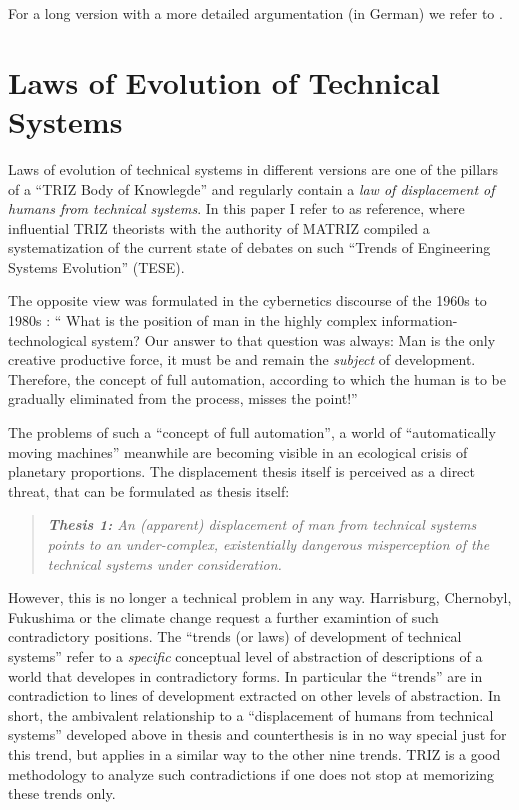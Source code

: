 \documentclass{llncs}
\begin{document}
For a long version with a more detailed argumentation (in German) we refer to
\cite{Graebe2020b}.

\section{Laws of Evolution of Technical Systems}

Laws of evolution of technical systems in different versions are one of the
pillars of a ``TRIZ Body of Knowlegde'' \cite{TBK-2007} and regularly contain
a \emph{law of displacement of humans from technical systems}.  In this paper
I refer to \cite{TESE2018} as reference, where influential TRIZ theorists with
the authority of MATRIZ compiled a systematization of the current state of
debates on such ``Trends of Engineering Systems Evolution'' (TESE).

The opposite view was formulated in the cybernetics discourse of the 1960s to
1980s \cite[p. 10]{KFK2000}: `` What is the position of man in the highly
complex information-techno\-logical system? Our answer to that question was
always: Man is the only creative productive force, it must be and remain the
\emph{subject} of development.  Therefore, the concept of full automation,
according to which the human is to be gradually eliminated from the process,
misses the point!''

The problems of such a ``concept of full automation'', a world of
``automatically moving machines'' meanwhile are becoming visible in an
ecological crisis of planetary proportions. The displacement thesis itself is
perceived as a direct threat, that can be formulated as thesis itself:
\begin{quote}\it
  \textbf{Thesis 1:} An (apparent) displacement of man from technical systems
  points to an under-complex, existentially dangerous misperception of the
  technical systems under consideration.
\end{quote}

However, this is no longer a technical problem in any way. Harrisburg,
Chernobyl, Fukushima or the climate change request a further examintion of
such contradictory positions.  The ``trends (or laws) of development of
technical systems'' refer to a \emph{specific} conceptual level of abstraction
of descriptions of a world that developes in contradictory forms.  In
particular the ``trends'' are in contradiction to lines of development
extracted on other levels of abstraction.  In short, the ambivalent
relationship to a ``displacement of humans from technical systems'' developed
above in thesis and counterthesis is in no way special just for this trend,
but applies in a similar way to the other nine trends.  TRIZ is a good
methodology to analyze such contradictions if one does not stop at memorizing
these trends only.
\end{document}
